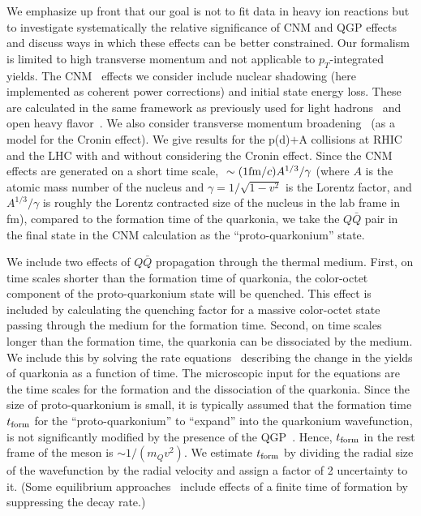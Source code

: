 \documentclass[article,showpacs,preprintnumbers,amsmath,amssymb]{revtex4}
\newcommand{\barQ}{{\bar{Q}}}
\newcommand{\rf}{{\rm form}}
\begin{document}
We emphasize up front that our goal is not to fit data in heavy ion reactions
but to investigate systematically the relative significance of CNM and QGP effects
and discuss ways in which these effects can be better constrained. Our
formalism is limited to high transverse momentum and not applicable to
$p_T$-integrated yields. The CNM~\cite{Vogt:2010aa} effects we consider include
nuclear shadowing (here implemented as coherent power corrections)  and initial
state energy loss. These are calculated in the same framework as previously used
for light hadrons~\cite{Vitev:2003xu,Gyulassy:2003mc,
Qiu:2003vd,Qiu:2004da,Vitev:2006,Vitev:2007ve,Neufeld:2011,Kang:2011bp} and open heavy
flavor~\cite{Vitev:2008vk,Vitev:2006bi,Kang:2011rt}. We also consider transverse momentum
broadening~\cite{Accardi:2002ik,Vitev:2003xu,Vitev:2006bi,Kang:2011rt} (as a model for 
the Cronin effect).  We give results for the p(d)$+$A collisions at RHIC and the
LHC with and without considering the Cronin effect. Since the CNM effects are
generated on a short time scale, $~\sim (1{\rm{fm}}/c) A^{1/3}/\gamma$ (where
$A$ is the atomic mass number of the nucleus and $\gamma=1/\sqrt{1-v^2}$ is the
Lorentz factor, and $A^{1/3}/\gamma$ is roughly the Lorentz contracted size of
the nucleus in the lab frame in fm), compared to the formation time of the
quarkonia, we take the $Q\bar{Q}$ pair in the final state in the CNM
calculation as the ``proto-quarkonium'' state.

We include two effects of $Q\barQ$ propagation through the thermal medium.
First, on time scales shorter than the formation time of quarkonia, the
color-octet component of the proto-quarkonium state will be quenched. This
effect is included by calculating the quenching factor for a massive
color-octet state passing through the medium for the formation time. Second, on
time scales longer than the formation time, the quarkonia can be dissociated by
the medium.  We include this by solving the rate
equations~\cite{hep-ph/0611109,Sharma:2009hn} describing the change in the
yields of quarkonia as a function of time. The microscopic input
for the equations are the time scales for the formation and the dissociation of
the quarkonia. Since the size of proto-quarkonium is small, it is typically
assumed that the formation time $t_\rf$ for the ``proto-quarkonium'' to
``expand'' into the quarkonium wavefunction, is not significantly modified by
the presence of the QGP~\cite{Strickland:LongAndShort}. Hence, $t_\rf$ in the
rest frame of the meson is $\sim 1/(m_Q v^2)$. We estimate $t_\rf$ by dividing
the radial size of the wavefunction by the radial velocity and assign a factor
of 2 uncertainty to it. (Some equilibrium approaches~\cite{Zhao:2008vu} include
effects of a finite time of formation by suppressing the decay rate.)
\end{document}
